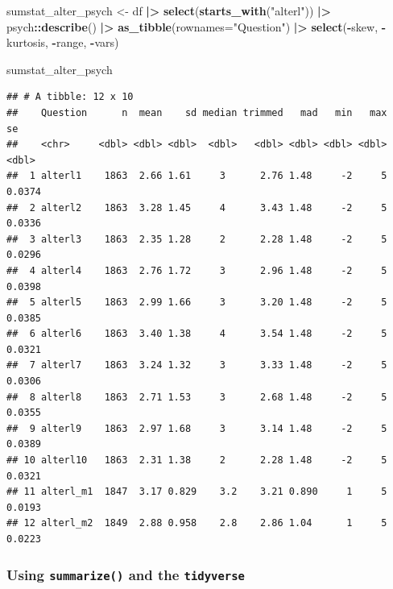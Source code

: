 \documentclass[
  doc]{apa6}
\newenvironment{Shaded}{\begin{snugshade}}{\end{snugshade}}
\newcommand{\AttributeTok}[1]{\textcolor[rgb]{0.13,0.29,0.53}{#1}}
\newcommand{\FunctionTok}[1]{\textcolor[rgb]{0.13,0.29,0.53}{\textbf{#1}}}
\newcommand{\NormalTok}[1]{#1}
\newcommand{\OtherTok}[1]{\textcolor[rgb]{0.56,0.35,0.01}{#1}}
\newcommand{\SpecialCharTok}[1]{\textcolor[rgb]{0.81,0.36,0.00}{\textbf{#1}}}
\newcommand{\StringTok}[1]{\textcolor[rgb]{0.31,0.60,0.02}{#1}}
\begin{document}
\begin{Shaded}
\begin{Highlighting}[]
\NormalTok{sumstat\_alter\_psych }\OtherTok{\textless{}{-}}\NormalTok{ df }\SpecialCharTok{|\textgreater{}}
  \FunctionTok{select}\NormalTok{(}\FunctionTok{starts\_with}\NormalTok{(}\StringTok{"alterl"}\NormalTok{)) }\SpecialCharTok{|\textgreater{}} 
\NormalTok{  psych}\SpecialCharTok{::}\FunctionTok{describe}\NormalTok{() }\SpecialCharTok{|\textgreater{}} 
  \FunctionTok{as\_tibble}\NormalTok{(}\AttributeTok{rownames=}\StringTok{"Question"}\NormalTok{)  }\SpecialCharTok{|\textgreater{}} 
  \FunctionTok{select}\NormalTok{(}\SpecialCharTok{{-}}\NormalTok{skew, }\SpecialCharTok{{-}}\NormalTok{kurtosis, }\SpecialCharTok{{-}}\NormalTok{range, }\SpecialCharTok{{-}}\NormalTok{vars) }

\NormalTok{sumstat\_alter\_psych}
\end{Highlighting}
\end{Shaded}

\begin{verbatim}
## # A tibble: 12 x 10
##    Question      n  mean    sd median trimmed   mad   min   max     se
##    <chr>     <dbl> <dbl> <dbl>  <dbl>   <dbl> <dbl> <dbl> <dbl>  <dbl>
##  1 alterl1    1863  2.66 1.61     3      2.76 1.48     -2     5 0.0374
##  2 alterl2    1863  3.28 1.45     4      3.43 1.48     -2     5 0.0336
##  3 alterl3    1863  2.35 1.28     2      2.28 1.48     -2     5 0.0296
##  4 alterl4    1863  2.76 1.72     3      2.96 1.48     -2     5 0.0398
##  5 alterl5    1863  2.99 1.66     3      3.20 1.48     -2     5 0.0385
##  6 alterl6    1863  3.40 1.38     4      3.54 1.48     -2     5 0.0321
##  7 alterl7    1863  3.24 1.32     3      3.33 1.48     -2     5 0.0306
##  8 alterl8    1863  2.71 1.53     3      2.68 1.48     -2     5 0.0355
##  9 alterl9    1863  2.97 1.68     3      3.14 1.48     -2     5 0.0389
## 10 alterl10   1863  2.31 1.38     2      2.28 1.48     -2     5 0.0321
## 11 alterl_m1  1847  3.17 0.829    3.2    3.21 0.890     1     5 0.0193
## 12 alterl_m2  1849  2.88 0.958    2.8    2.86 1.04      1     5 0.0223
\end{verbatim}

\hypertarget{using-summarize-and-the-tidyverse}{%
\subsubsection{\texorpdfstring{Using \texttt{summarize()} and the \texttt{tidyverse}}{Using summarize() and the tidyverse}}\label{using-summarize-and-the-tidyverse}}
\end{document}
